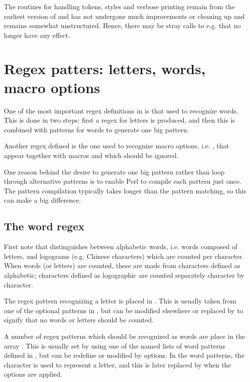 \documentclass{article}
\begin{document}
The routines for handling tokens, styles and verbose printing remain from the earliest version of \TeXcount{} and has not undergone much improvements or cleaning up and remains somewhat unstructured. Hence, there may be stray calls to e.g.  that no longer have any effect.



\section{Regex patters: letters, words, macro options}

One of the most important regex definitions in \TeXcount{} is that used to recognize words. This is done in two steps: first a regex for letters is produced, and then this is combined with patterns for words to generate one big pattern.

Another regex defined is the one used to recognize macro options, i.e. \code{[\ldots]}, that appear together with macros and which should be ignored.

One reason behind the desire to generate one big pattern rather than loop through alternative patterns is to enable Perl to compile each pattern just once. The pattern compilation typically takes longer than the pattern matching, so this can make a big difference.


\subsection{The word regex}

First note that \TeXcount{} distinguishes between alphabetic words, i.e. words composed of letters, and logograms (e.g. Chinese characters) which are counted per character. When words (or letters) are counted, these are made from characters defined as alphabetic; characters defined as logographic are counted separately character by character.

The regex pattern recognizing a letter is placed in . This is usually taken from one of the optional patterns in , but can be modified elsewhere or replaced by  to signify that no words or letters should be counted.

A number of regex patterns which should be recognized as words are place in the array \code{\@WordPatterns}. This is usually set by using one of the named lists of word patterns defined in , but can be redefine or modified by options. In the word patterns, the character \code{\@} is used to represent a letter, and this is later replaced by  when the options are applied.
\end{document}
